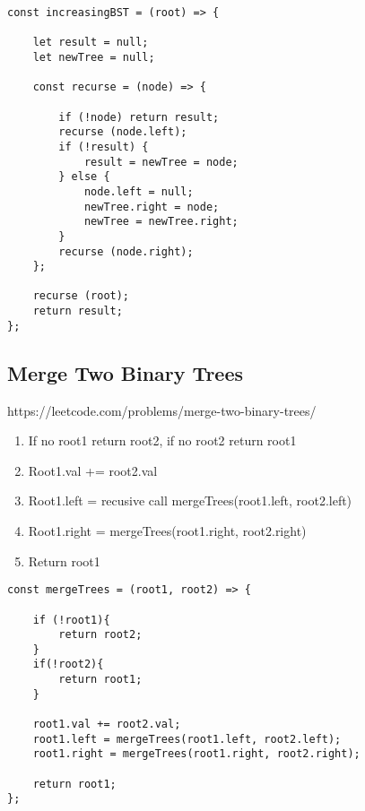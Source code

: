 \documentclass[10pt]{article}
\begin{document}
\begin{lstlisting}[title=Solution increasingBST, captionpos=t]
const increasingBST = (root) => {
    
    let result = null;
    let newTree = null;
    
    const recurse = (node) => {
        
        if (!node) return result;
        recurse (node.left);
        if (!result) {
            result = newTree = node;
        } else {
            node.left = null;
            newTree.right = node;
            newTree = newTree.right;
        }
        recurse (node.right);
    };

    recurse (root);
    return result;
};
\end{lstlisting}

\medskip %












\pagebreak
\medskip   
\subsection {Merge Two Binary Trees}
https://leetcode.com/problems/merge-two-binary-trees/

\begin{enumerate}
	\item If no root1 return root2, if no root2 return root1
	\item Root1.val += root2.val
	\item Root1.left = recusive call mergeTrees(root1.left, root2.left)
	\item Root1.right = mergeTrees(root1.right, root2.right)
	\item Return root1 
\end{enumerate}

\begin{lstlisting}[title=Solution mergeTrees, captionpos=t]
const mergeTrees = (root1, root2) => {
    
    if (!root1){
        return root2;
    }
    if(!root2){
        return root1;
    }
    
    root1.val += root2.val;
    root1.left = mergeTrees(root1.left, root2.left);
    root1.right = mergeTrees(root1.right, root2.right);
    
    return root1; 
};
\end{lstlisting}
\end{document}
